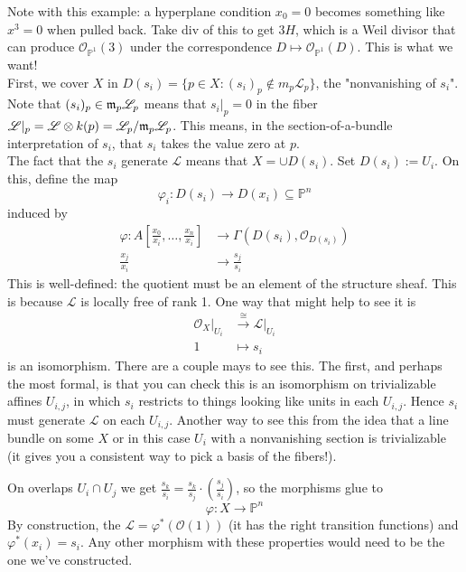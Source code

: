 \documentclass[10pt,reqno]{amsart}
\theoremstyle{definition}
\theoremstyle{remark}
\numberwithin{equation}{section}
\numberwithin{theorem}{section}
\newcommand{\OO}{{\mathcal O}}
\newcommand{\LL}{{\mathscr L}}
\newcommand{\mm}{\frak{m}}
\newcommand{\PP}{{\mathbb P}}
\begin{document}
Note with this example: a hyperplane condition $x_0 = 0$ becomes something like $x^3 = 0$ when pulled back. Take div of this to get $3H$, which is a Weil divisor that can produce $\OO_{\PP^1}(3)$ under the correspondence $D \mapsto \OO_{\PP^1}(D)$. This is what we want!
\\

First, we cover $X$ in $D(s_i) = \{p \in X: (s_i)_p \not\in m_p \LL_p\}$, the "nonvanishing of $s_i$". Note that $(s_i)_p \in \mm_p \LL_p$ means that $s_i|_p = 0$ in the fiber $\LL|_p = \LL \otimes k(p) = \LL_p/\mm_p\LL_p$. This means, in the section-of-a-bundle interpretation of $s_i$, that $s_i$ takes the value zero at $p$.
\\

The fact that the $s_i$ generate $\LL$ means that $X = \cup D(s_i)$. Set $D(s_i) := U_i$. On this, define the map
\[\varphi_i: D(s_i) \to D(x_i) \subseteq \PP^n\]
induced by 
\begin{align*}
\varphi: A\left[\frac{x_0}{x_i},\dots,\frac{x_n}{x_i}\right] &\to \Gamma(D(s_i),\OO_{D(s_i)})\\
 \frac{x_j}{x_i} &\to \frac{s_j}{s_i}
\end{align*} 
This is well-defined: the quotient must be an element of the structure sheaf. This is because $\LL$ is locally free of rank 1. One way that might help to see it is 
\begin{align*}
\OO_{X}|_{U_i} &\stackrel{\cong}{\longrightarrow} \LL|_{U_i}\\
1 &\mapsto s_i
\end{align*}
is an isomorphism. There are a couple mays to see this. The first, and perhaps the most formal, is that you can check this is an isomorphism on trivializable affines $U_{i,j}$, in which $s_i$ restricts to things looking like units in each $U_{i,j}$. Hence $s_i$ must generate $\LL$ on each $U_{i,j}$. Another way to see this from the idea that a line bundle on some $X$ or in this case $U_i$ with a nonvanishing section is trivializable (it gives you a consistent way to pick a basis of the fibers!).

On overlaps $U_i \cap U_j$ we get $\frac{s_k}{s_i} = \frac{s_k}{s_j} \cdot (\frac{s_j}{s_i})$, so the morphisms glue to
\[\varphi: X \to \PP^n\]
By construction, the $\LL = \varphi^*(\OO(1))$ (it has the right transition functions) and $\varphi^*(x_i) = s_i$. Any other morphism with these properties would need to be the one we've constructed.
\end{document}
